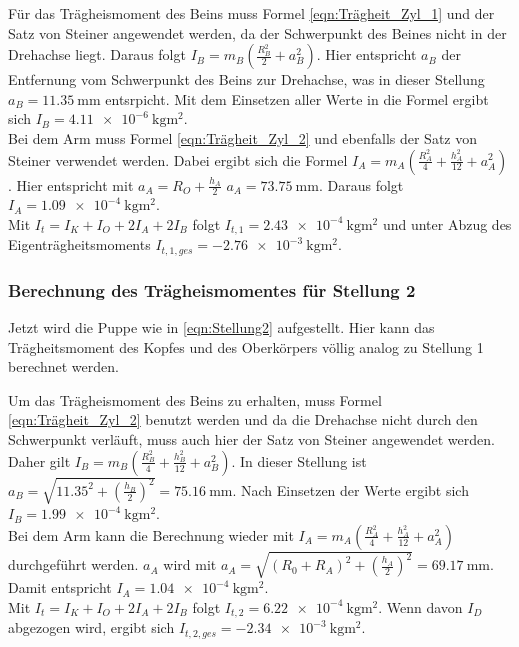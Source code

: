     Für das Trägheismoment des Beins muss Formel \ref{eqn:Trägheit_Zyl_1} und der Satz von Steiner angewendet werden, da der  Schwerpunkt des Beines nicht in der Drehachse liegt.
    Daraus folgt $I_B=m_B(\frac{R_B^2}{2}+a_B^2)$.
    Hier entspricht $a_B$ der Entfernung vom Schwerpunkt des Beins zur Drehachse, was in dieser Stellung $a_B=\qty{11.35}{\milli\meter}$ entsrpicht.
    Mit dem Einsetzen aller Werte in die Formel ergibt sich $I_B=\qty{4.11e-6}{\kilo\gram\meter\squared}$.\\

    Bei dem Arm muss Formel \ref{eqn:Trägheit_Zyl_2} und ebenfalls der Satz von Steiner verwendet werden.
    Dabei ergibt sich die Formel $I_A=m_A(\frac{R_A^2}{4}+\frac{h_A^2}{12}+a_A^2)$.
    Hier entspricht mit $a_A=R_O+\frac{h_A}{2}$ \; $a_A=\qty{73.75}{\milli\meter}$.
    Daraus folgt $I_A=\qty{1.09e-4}{\kilo\gram\meter\squared}$.\\
    
    Mit $I_{t}=I_K+I_O+2I_A+2I_B$ folgt $I_{t,1}=\qty{2.43e-4}{\kilo\gram\meter\squared}$ und unter Abzug des Eigenträgheitsmoments
     $I_{t,1,ges}=\qty{-2.76e-3}{\kilo\gram\meter\squared}$.

    \subsubsection{Berechnung des Trägheismomentes für Stellung 2}
    Jetzt wird die Puppe wie in \ref{eqn:Stellung2} aufgestellt.%
    Hier kann das Trägheitsmoment des Kopfes und des Oberkörpers völlig analog zu Stellung 1 berechnet werden.
    
    Um das Trägheismoment des Beins zu erhalten, muss Formel \ref{eqn:Trägheit_Zyl_2} benutzt werden und da die Drehachse nicht durch den Schwerpunkt verläuft, muss auch hier der Satz von Steiner angewendet werden.
    Daher gilt $I_B=m_B(\frac{R_B^2}{4}+\frac{h_B^2}{12}+a_B^2)$.
    In dieser Stellung ist $a_B=\sqrt{11.35^2+(\frac{h_B}{2})^2}=\qty{75.16}{\milli\meter}$.
    Nach Einsetzen der Werte ergibt sich $I_B=\qty{1.99e-4}{\kilo\gram\meter\squared}$.\\

    Bei dem Arm kann die Berechnung wieder mit $I_A=m_A(\frac{R_A^2}{4}+\frac{h_A^2}{12}+a_A^2)$ durchgeführt werden.
    $a_A$ wird mit $a_A=\sqrt{(R_0+R_A)^2+(\frac{h_A}{2})^2}=\qty{69.17}{\milli\meter}$.
    Damit entspricht $I_A=\qty{1.04e-4}{\kilo\gram\meter\squared}$.\\
    
    Mit $I_{t}=I_K+I_O+2I_A+2I_B$ folgt $I_{t,2}=\qty{6.22e-4}{\kilo\gram\meter\squared}$.
    Wenn davon $I_D$ abgezogen wird, ergibt sich $I_{t,2,ges}=\qty{-2.34e-3}{\kilo\gram\meter\squared}$.





    
    

    

    
